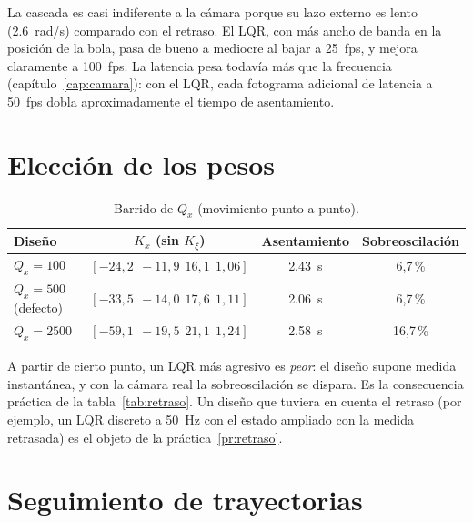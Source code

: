 La cascada es casi indiferente a la cámara porque su lazo externo es lento (\SI{2.6}{rad/s}) comparado con el retraso. El LQR, con más ancho de banda en la posición de la bola, pasa de bueno a mediocre al bajar a \SI{25}{fps}, y mejora claramente a \SI{100}{fps}. La latencia pesa todavía más que la frecuencia (capítulo~\ref{cap:camara}): con el LQR, cada fotograma adicional de latencia a \SI{50}{fps} dobla aproximadamente el tiempo de asentamiento.

\section{Elección de los pesos}
\label{sec:pesos}

\begin{table}[H]
\centering\small
\begin{tabular}{@{}lccc@{}}
\toprule
Diseño & $K_x$ (sin $K_\xi$) & Asentamiento & Sobreoscilación\\
\midrule
$Q_x=100$ & $[-24{,}2\ \ -11{,}9\ \ 16{,}1\ \ 1{,}06]$ & \SI{2.43}{s} & 6,7\,\%\\
$Q_x=500$ (defecto) & $[-33{,}5\ \ -14{,}0\ \ 17{,}6\ \ 1{,}11]$ & \SI{2.06}{s} & 6,7\,\%\\
$Q_x=2500$ & $[-59{,}1\ \ -19{,}5\ \ 21{,}1\ \ 1{,}24]$ & \SI{2.58}{s} & 16,7\,\%\\
\bottomrule
\end{tabular}
\caption{Barrido de $Q_x$ (movimiento punto a punto).}
\end{table}

A partir de cierto punto, un LQR más agresivo es \emph{peor}: el diseño supone medida instantánea, y con la cámara real la sobreoscilación se dispara. Es la consecuencia práctica de la tabla~\ref{tab:retraso}. Un diseño que tuviera en cuenta el retraso (por ejemplo, un LQR discreto a \SI{50}{Hz} con el estado ampliado con la medida retrasada) es el objeto de la práctica~\ref{pr:retraso}.

\section{Seguimiento de trayectorias}

